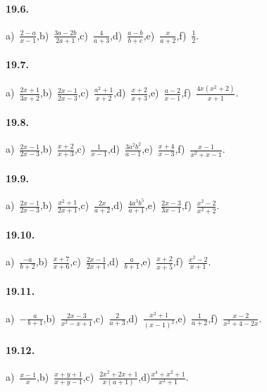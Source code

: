 \paragraph{19.6.}
a)~$\frac{2-a}{x-1}$,\quad b)~$\frac{3a-2b}{2a+1}$,\quad c)~$\frac{4}{a+3}$,\quad d)~$\frac{a-b}{b+c}$,\quad e)~$\frac{x}{a+2}$,\quad f)~$\frac{1}{2}$.

\paragraph{19.7.}
a)~$\frac{2x+1}{3x+2}$,\quad b)~$\frac{2x-1}{2x-3}$,\quad c)~$\frac{a^2+1}{x+2}$,\quad d)~$\frac{x+2}{x+3}$,\quad e)~$\frac{a-2}{x-1}$,\quad f)~$\frac{4x\left(x^2+2\right)}{x+1}$.

\paragraph{19.8.}
a)~$\frac{2x-1}{2x-3}$,\quad b)~$\frac{x+2}{x+3}$,\quad c)~$\frac{1}{x-1}$,\quad d)~$\frac{3a^{2}b^{2}}{a-1}$,\quad e)~$\frac{x+4}{x-3}$,\quad f)~$\frac{x-1}{x^2+x-1}$.

\paragraph{19.9.}
a)~$\frac{2x-1}{2x-3}$,\quad b)~$\frac{x^2+1}{2x+1}$,\quad c)~$\frac{2x}{a+2}$,\quad d)~$\frac{4a^{3}b^{5}}{a+1}$,\quad e)~$\frac{2x-3}{3x-1}$,\quad f)~$\frac{x^2-2}{x^2+2}$.

\paragraph{19.10.}
a)~$\frac{-a}{b+2}$,\quad b)~$\frac{x+7}{x+6}$,\quad c)~$\frac{2x-1}{2x+1}$,\quad d)~$\frac{a}{b+1}$,\quad e)~$\frac{x+2}{x+5}$,\quad f)~$\frac{x^{2}-2}{x+1}$.

\paragraph{19.11.}
a)~$-\frac{a}{b+1}$,\quad b)~$\frac{2x-3}{x^2-x+1}$,\quad c)~$\frac{2}{a+3}$,\quad d)~$\frac{x^{2}+1}{(x-1)^2}$,\quad e)~$\frac{1}{a+2}$,\quad f)~$\frac{x-2}{x^2+4-2x}$.

\paragraph{19.12.}
a)~$\frac{x-1}{x}$,\quad b)~$\frac{x+y+1}{x+y-1}$,\quad c)~$\frac{2x^2+2x+1}{x(a+1)}$,\quad d)$\frac{x^{4}+x^{2}+1}{x^2+1}$.

